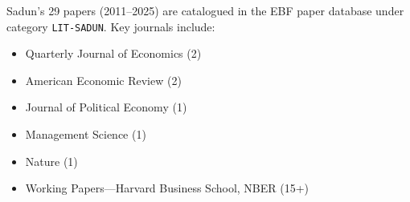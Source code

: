 \nocite{bcm_master}

Sadun's 29 papers (2011--2025) are catalogued in the EBF paper database
under category \texttt{LIT-SADUN}. Key journals include:
\begin{itemize}[nosep]
    \item Quarterly Journal of Economics (2)
    \item American Economic Review (2)
    \item Journal of Political Economy (1)
    \item Management Science (1)
    \item Nature (1)
    \item Working Papers---Harvard Business School, NBER (15+)
\end{itemize}


